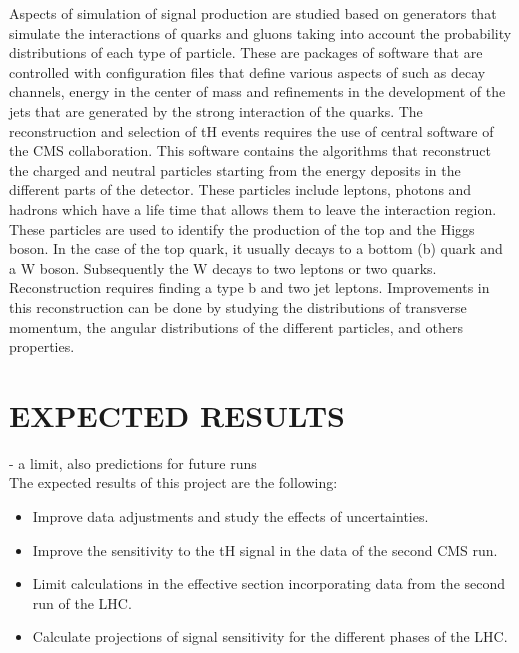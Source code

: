 \documentclass{article}
\begin{document}
\onehalfspacing Aspects of simulation of signal production are studied based on generators that simulate the 
interactions of quarks and gluons taking into account the probability distributions of each 
type of particle. These are packages of software that are controlled with configuration files 
that define various aspects of such as decay channels, energy in the center of mass and 
refinements in the development of the jets that are generated by the strong interaction of 
the quarks. The reconstruction and selection of tH events requires the use of central 
software of the CMS collaboration. This software contains the algorithms that reconstruct the 
charged and neutral particles starting from the energy deposits in the different parts of the 
detector. These particles include leptons, photons and hadrons which have a life time that 
allows them to leave the interaction region. These particles are used to identify the 
production of the top and the Higgs boson. In the case of the top quark, it usually decays to 
a bottom (b) quark and a W boson. Subsequently the W decays to two leptons or two quarks. 
Reconstruction requires finding a type b and two jet leptons. Improvements in this 
reconstruction can be done by studying the distributions of transverse momentum, the angular 
distributions of the different particles, and others properties.

\section{EXPECTED RESULTS}
- a limit, also predictions for future runs\\

\onehalfspacing The expected results of this project are the following:\\
\begin{itemize}

\item Improve data adjustments and study the effects of uncertainties.\\
\item Improve the sensitivity to the tH signal in the data of the second CMS run.\\
\item Limit calculations in the effective section incorporating data from the second
run of the LHC.\\
\item Calculate projections of signal sensitivity for the different phases of the LHC.
\end{itemize}
\end{document}
